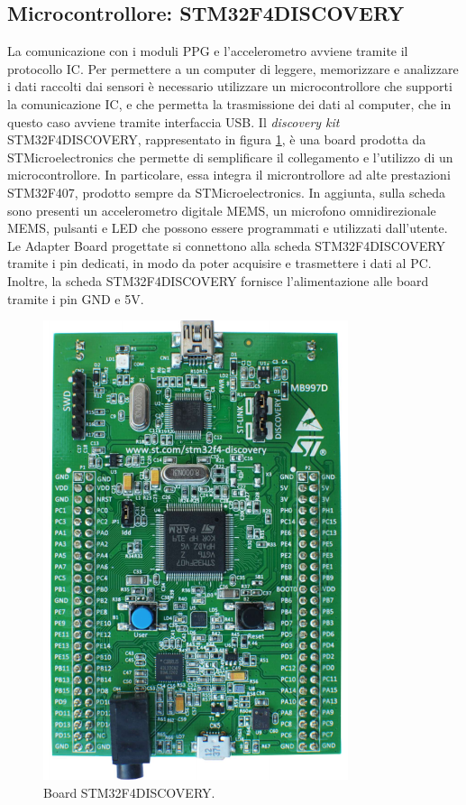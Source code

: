\subsection{Microcontrollore: STM32F4DISCOVERY}
La comunicazione con i moduli PPG e l'accelerometro avviene tramite il protocollo IC. Per permettere a un computer di leggere, memorizzare e analizzare i dati raccolti dai sensori è necessario utilizzare un microcontrollore che supporti la comunicazione IC, e che permetta la trasmissione dei dati al computer, che in questo caso avviene tramite interfaccia USB. Il \textit{discovery kit} STM32F4DISCOVERY\cite{STMicroelectronics2020}, rappresentato in figura \ref{fig:ImmagineSTM32F4DISCOVERY}, è una board prodotta da STMicroelectronics che permette di semplificare il collegamento e l'utilizzo di un microcontrollore. In particolare, essa integra il microntrollore ad alte prestazioni STM32F407, prodotto sempre da STMicroelectronics. In aggiunta, sulla scheda sono presenti un accelerometro digitale MEMS, un microfono omnidirezionale MEMS, pulsanti e LED che possono essere programmati e utilizzati dall'utente. Le Adapter Board progettate si connettono alla scheda STM32F4DISCOVERY tramite i pin dedicati, in modo da poter acquisire e trasmettere i dati al PC. Inoltre, la scheda STM32F4DISCOVERY fornisce l'alimentazione alle board tramite i pin GND e 5V.
\begin{figure}[h]
	\centering
	\includegraphics[width=0.5\linewidth]{ImageFiles/Hardware/ImmagineSTM32F4DISCOVERY}
	\caption{Board STM32F4DISCOVERY.}
	\label{fig:ImmagineSTM32F4DISCOVERY}
\end{figure}

\clearpage
